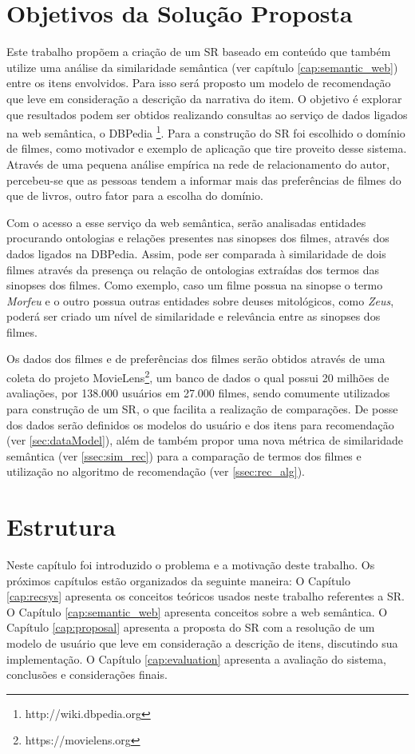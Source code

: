 \section{Objetivos da Solução Proposta}

Este trabalho propõem a criação de um SR baseado em conteúdo que também utilize uma análise da similaridade semântica (ver capítulo \ref{cap:semantic_web}) entre os itens envolvidos. Para isso será proposto um modelo de recomendação que leve em consideração a descrição da narrativa do item. O objetivo é explorar que resultados podem ser obtidos realizando consultas ao serviço de dados ligados na web semântica, o DBPedia \footnote{http://wiki.dbpedia.org}. Para a construção do SR foi escolhido o domínio de filmes, como motivador e exemplo de aplicação que tire proveito desse sistema. Através de uma pequena análise empírica na rede de relacionamento do autor, percebeu-se que as pessoas tendem a informar mais das preferências de filmes do que de livros, outro fator para a escolha do domínio.

Com o acesso a esse serviço da web semântica, serão analisadas entidades procurando ontologias e relações presentes nas sinopses dos filmes, através dos dados ligados na DBPedia. Assim, pode ser comparada à similaridade de dois filmes através da presença ou relação de ontologias extraídas dos termos das sinopses dos filmes. Como exemplo, caso um filme possua na sinopse o termo \textit{Morfeu} e o outro possua outras entidades sobre deuses mitológicos, como \textit{Zeus}, poderá ser criado um nível de similaridade e relevância entre as sinopses dos filmes.

Os dados dos filmes e de preferências dos filmes serão obtidos através de uma coleta do projeto MovieLens\footnote{https://movielens.org}, um banco de dados o qual possui 20 milhões de avaliações, por 138.000 usuários em 27.000 filmes, sendo comumente utilizados para construção de um \ac{SR}, o que facilita a realização de comparações. De posse dos dados serão definidos os modelos do usuário e dos itens para recomendação (ver \ref{sec:dataModel}), além de também propor uma nova métrica de similaridade semântica (ver \ref{ssec:sim_rec}) para a comparação de termos dos filmes e utilização no algoritmo de recomendação (ver \ref{ssec:rec_alg}).

\section{Estrutura}
Neste capítulo foi introduzido o problema e a motivação deste trabalho. Os próximos capítulos estão organizados da seguinte maneira: O Capítulo \ref{cap:recsys} apresenta os conceitos teóricos usados neste trabalho referentes a SR. O Capítulo \ref{cap:semantic_web} apresenta conceitos sobre a web semântica. O Capítulo \ref{cap:proposal} apresenta a proposta do SR com a resolução de um modelo de usuário que leve em consideração a descrição de itens, discutindo sua implementação. O Capítulo \ref{cap:evaluation} apresenta a avaliação do sistema, conclusões e considerações finais.